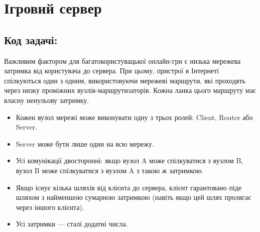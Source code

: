 \documentclass[12pt,a4paper]{article}
\begin{document}
\section*{Ігровий сервер \hfill {}}


\subsection*{Код задачі: }

Важливим фактором для багатокористувацької онлайн-гри є низька мережева затримка від користувача до сервера.
При цьому, пристрої в Інтернеті спілкуються один з одним, використовуючи мережеві маршрути, які проходять через низку проміжних вузлів-маршрутизаторів. Кожна ланка цього маршруту має власну ненульову затримку.

\begin{center}
    \footnotesize
\end{center}

\begin{itemize}
    \item Кожен вузол мережі може виконувати одну з трьох ролей: Client, Router або Server.
    \item Server може бути лише один на всю мережу.
    \item Усі комунікації двосторонні: якщо вузол A може спілкуватися з вузлом B, вузол B може спілкуватися з вузлом A з такою ж затримкою.
    \item Якщо існує кілька шляхів від клієнта до сервера, клієнт гарантовано піде шляхом з найменшою сумарною затримкою (навіть якщо цей шлях пролягає через іншого клієнта).
    \item Усі затримки --- сталі додатні числа.
\end{itemize}
\end{document}
